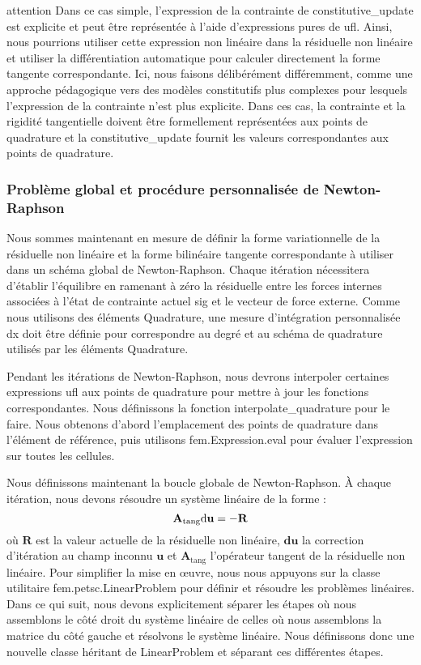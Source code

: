 \documentclass[10pt]{book}
\begin{document}
{attention}
Dans ce cas simple, l'expression de la contrainte de constitutive\_update est explicite et peut être représentée à l'aide d'expressions pures de ufl. Ainsi, nous pourrions utiliser cette expression non linéaire dans la résiduelle non linéaire et utiliser la différentiation automatique pour calculer directement la forme tangente correspondante. Ici, nous faisons délibérément différemment, comme une approche pédagogique vers des modèles constitutifs plus complexes pour lesquels l'expression de la contrainte n'est plus explicite. Dans ces cas, la contrainte et la rigidité tangentielle doivent être formellement représentées aux points de quadrature et la constitutive\_update fournit les valeurs correspondantes aux points de quadrature.
\subsubsection{Problème global et procédure personnalisée de Newton-Raphson}
Nous sommes maintenant en mesure de définir la forme variationnelle de la résiduelle non linéaire et la forme bilinéaire tangente correspondante à utiliser dans un schéma global de Newton-Raphson. Chaque itération nécessitera d'établir l'équilibre en ramenant à zéro la résiduelle entre les forces internes associées à l'état de contrainte actuel sig et le vecteur de force externe. Comme nous utilisons des éléments Quadrature, une mesure d'intégration personnalisée dx doit être définie pour correspondre au degré et au schéma de quadrature utilisés par les éléments Quadrature.

Pendant les itérations de Newton-Raphson, nous devrons interpoler certaines expressions ufl aux points de quadrature pour mettre à jour les fonctions correspondantes. Nous définissons la fonction interpolate\_quadrature pour le faire. Nous obtenons d'abord l'emplacement des points de quadrature dans l'élément de référence, puis utilisons fem.Expression.eval pour évaluer l'expression sur toutes les cellules.

Nous définissons maintenant la boucle globale de Newton-Raphson. À chaque itération, nous devons résoudre un système linéaire de la forme :
$$\mathbf{A}_\text{tang}\mathbf{\mathrm{d} u} = -\mathbf{R}$$
où $\mathbf{R}$ est la valeur actuelle de la résiduelle non linéaire, $\mathbf{du}$ la correction d'itération au champ inconnu $\mathbf{u}$ et $\mathbf{A}_\text{tang}$ l'opérateur tangent de la résiduelle non linéaire. Pour simplifier la mise en œuvre, nous nous appuyons sur la classe utilitaire fem.petsc.LinearProblem pour définir et résoudre les problèmes linéaires. Dans ce qui suit, nous devons explicitement séparer les étapes où nous assemblons le côté droit du système linéaire de celles où nous assemblons la matrice du côté gauche et résolvons le système linéaire. Nous définissons donc une nouvelle classe héritant de LinearProblem et séparant ces différentes étapes.
\end{document}
